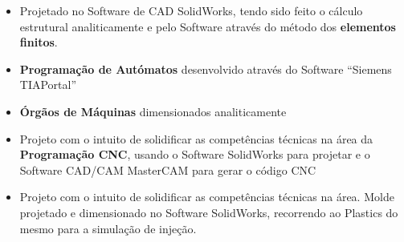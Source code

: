 \documentclass[10pt,a4paper]{altacv}
\begin{document}
\smallskip


     



\begin{itemize}
	\item Projetado no Software de CAD SolidWorks, tendo sido feito o cálculo estrutural analiticamente e pelo Software através do método dos \textbf{elementos finitos}.
	\item \textbf{Programação de Autómatos} desenvolvido através do Software “Siemens TIAPortal”
	\item \textbf{Órgãos de Máquinas} dimensionados analiticamente
\end{itemize}

\divider


\begin{itemize}
	\item Projeto com o intuito de solidificar as competências técnicas na área da \textbf{Programação CNC}, usando o Software SolidWorks para projetar e o Software CAD/CAM MasterCAM para gerar o código CNC
	
\end{itemize}

\divider


\begin{itemize}
	\item Projeto com o intuito de solidificar as competências técnicas na área.
	Molde projetado e dimensionado no Software SolidWorks, recorrendo ao Plastics do mesmo para a simulação de injeção.
\end{itemize}

\smallskip

     
\end{document}
